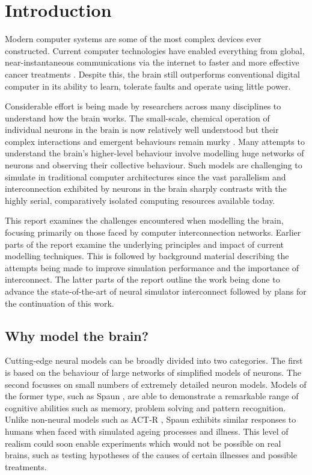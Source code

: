 \chapter{Introduction}
	
	Modern computer systems are some of the most complex devices ever constructed.
	Current computer technologies have enabled everything from global,
	near-instantaneous communications via the internet to faster and more
	effective cancer treatments \cite{nassif}. Despite this, the brain still
	outperforms conventional digital computer in its ability to learn, tolerate
	faults and operate using little power.
	
	Considerable effort is being made by researchers across many disciplines to
	understand how the brain works. The small-scale, chemical operation of
	individual neurons in the brain is now relatively well understood but their
	complex interactions and emergent behaviours remain murky \cite{dayan03}. Many
	attempts to understand the brain's higher-level behaviour involve modelling
	huge networks of neurons and observing their collective behaviour.  Such
	models are challenging to simulate in traditional computer architectures since
	the vast parallelism and interconnection exhibited by neurons in the brain
	sharply contrasts with the highly serial, comparatively isolated computing
	resources available today.
	
	This report examines the challenges encountered when modelling the brain,
	focusing primarily on those faced by computer interconnection networks.
	Earlier parts of the report examine the underlying principles and impact of
	current modelling techniques. This is followed by background material
	describing the attempts being made to improve simulation performance and the
	importance of interconnect. The latter parts of the report outline the work
	being done to advance the state-of-the-art of neural simulator interconnect
	followed by plans for the continuation of this work.
	
	\section{Why model the brain?}
	
		Cutting-edge neural models can be broadly divided into two categories. The
		first is based on the behaviour of large networks of simplified models of
		neurons.  The second focusses on small numbers of extremely detailed neuron
		models.  Models of the former type, such as Spaun \cite{eliasmith12}, are
		able to demonstrate a remarkable range of cognitive abilities such as
		memory, problem solving and pattern recognition. Unlike non-neural models
		such as ACT-R \cite{anderson93}, Spaun exhibits similar responses to humans
		when faced with simulated ageing processes and illness. This level of
		realism could soon enable experiments which would not be possible on real
		brains, such as testing hypotheses of the causes of certain illnesses and
		possible treatments.
		
